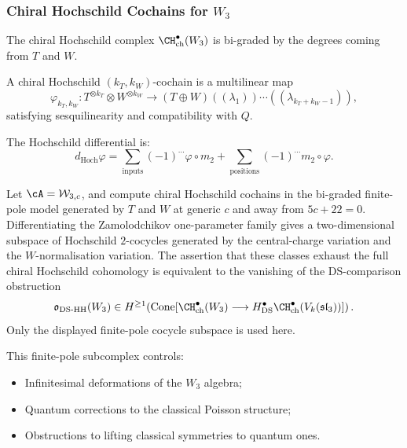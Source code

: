 \subsubsection{Chiral Hochschild Cochains for $W_3$}

The chiral Hochschild complex $\CH^\bullet_{\text{ch}}(W_3)$ is bi-graded by the degrees coming from $T$ and $W$.

\begin{definition}
A chiral Hochschild $(k_T, k_W)$-cochain is a multilinear map
\begin{equation}
\varphi_{k_T, k_W}: T^{\otimes k_T} \otimes W^{\otimes k_W} \to (T \oplus W)((\lambda_1))\cdots((\lambda_{k_T+k_W-1})),
\end{equation}
satisfying sesquilinearity and compatibility with $Q$.
\end{definition}

The Hochschild differential is:
\begin{equation}
d_{\text{Hoch}} \varphi = \sum_{\text{inputs}} (-1)^{\cdots} \varphi \circ m_2 + \sum_{\text{positions}} (-1)^{\cdots} m_2 \circ \varphi.
\end{equation}

\begin{proposition}
Let\/ $\cA=\mathcal W_{3,c}$, and compute chiral Hochschild cochains
in the bi-graded finite-pole model generated by $T$ and $W$ at generic
$c$ and away from $5c+22=0$. Differentiating the Zamolodchikov
one-parameter family gives a two-dimensional subspace of Hochschild
$2$-cocycles generated by the central-charge variation and the
$W$-normalisation variation. The assertion that these classes exhaust
the full chiral Hochschild cohomology is equivalent to the vanishing of
the DS-comparison obstruction
\[
 \mathfrak{o}_{\mathrm{DS\text{-}HH}}(W_3)
 \in
 H^{\ge 1}\!\left(
 \operatorname{Cone}\!\left[
 \CH^\bullet_{\mathrm{ch}}(W_3)
 \longrightarrow
 H^\bullet_{\mathrm{DS}}
 \CH^\bullet_{\mathrm{ch}}(V_k(\mathfrak{sl}_3))
 \right]\right).
\]
Only the displayed finite-pole cocycle subspace is used here.
\end{proposition}

This finite-pole subcomplex controls:
\begin{itemize}
\item Infinitesimal deformations of the $W_3$ algebra;
\item Quantum corrections to the classical Poisson structure;
\item Obstructions to lifting classical symmetries to quantum ones.
\end{itemize}


